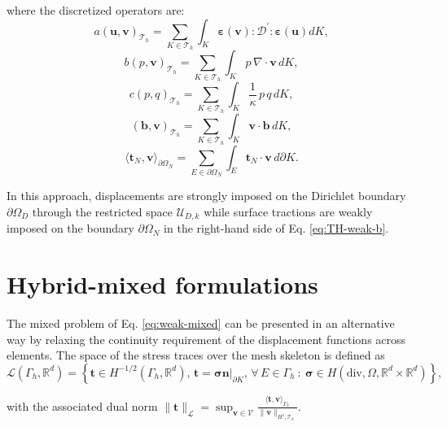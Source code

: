 \documentclass[english,11pt,3p,number,sort&compress]{elsarticle}
\begin{document}
\noindent where the discretized operators are:
\begin{equation*}
	a\left(\bm{u},\bm{v}\right)_{\mathcal{T}_h} = \sum_{K \in \mathcal{T}_h} \int_{K} \bm{\varepsilon}(\bm{v}) : \mathcal{D}^{'} : \bm{\varepsilon}(\bm{u}) dK ,
\end{equation*}
\begin{equation*}
	b\left(p, \bm{v}\right)_{\mathcal{T}_h} = \sum_{K \in \mathcal{T}_h} \int_{K} p \,\nabla \cdot \bm{v} \, dK ,
\end{equation*}
\begin{equation*}
	c\left(p,q \right)_{\mathcal{T}_h} = \sum_{K \in \mathcal{T}_h} \int_{K} \frac{1}{\kappa} \,p \,q \, dK ,
\end{equation*}
\begin{equation*}
	\left(\bm{b},\bm{v}\right)_{\mathcal{T}_h} = \sum_{K \in \mathcal{T}_h} \int_{K} \bm{v} \cdot \bm{b} \, dK ,
\end{equation*}
\begin{equation*}
	\langle\bm{t}_N,\bm{v}\rangle_{\partial\Omega_N} = \sum_{E \in \partial\Omega_N} \int_{E} \bm{t}_N \cdot \bm{v} \, d\partial K .
\end{equation*}

In this approach, displacements are strongly imposed on the Dirichlet boundary $\partial \Omega_D$ through the restricted space $\mathcal{U}_{D,k}$ while surface tractions are weakly imposed on the boundary $\partial \Omega_N$ in the right-hand side of Eq. \eqref{eq:TH-weak-b}.

\section{Hybrid-mixed formulations}

The mixed problem of Eq. \eqref{eq:weak-mixed} can be presented in an alternative way by relaxing the continuity requirement of the displacement functions across elements. The space of the stress traces over the mesh skeleton is defined as
\begin{equation}
	\label{eq:space-traction}
	\mathcal{L}(\Gamma_h,\mathbb{R}^d) = \left\{\bm{t} \in H^{-1/2}(\Gamma_h,\mathbb{R}^d), \, \bm{t}=\bm{\sigma}\bm{n}\lvert_{\partial K}, \, \forall \, E \in \Gamma_h ~:~\bm{\sigma} \in H(\text{div},\Omega,\mathbb{R}^d \times \mathbb{R}^d) \right\},
\end{equation}

\noindent with the associated dual norm $\lVert\bm{t}\rVert_{\mathcal{L}}=\sup_{\bm{v}\in\mathcal{V}}\frac{\langle\bm{t},\bm{v} \rangle_{\Gamma_h}}{\lVert\bm{v}\rVert_{H^1,\mathcal{T}_h}}$.
\end{document}
